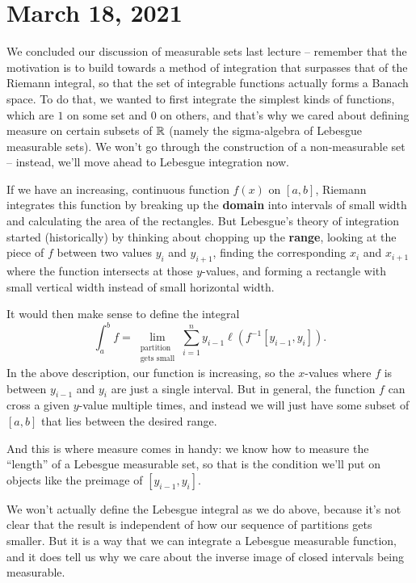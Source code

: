 \pagebreak\section{March 18, 2021}

We concluded our discussion of measurable sets last lecture -- remember that the motivation is to build towards a method of integration that surpasses that of the Riemann integral, so that the set of integrable functions actually forms a Banach space. To do that, we wanted to first integrate the simplest kinds of functions, which are $1$ on some set and $0$ on others, and that's why we cared about defining measure on certain subsets of $\mathbb R$ (namely the sigma-algebra of Lebesgue measurable sets). We won't go through the construction of a non-measurable set -- instead, we'll move ahead to Lebesgue integration now. 

\begin{fact}[Informal]
If we have an increasing, continuous function $f(x)$ on $[a, b]$, Riemann integrates this function by breaking up the \textbf{domain} into intervals of small width and calculating the area of the rectangles. But Lebesgue's theory of integration started (historically) by thinking about chopping up the \textbf{range}, looking at the piece of $f$ between two values $y_i$ and $y_{i+1}$, finding the corresponding $x_i$ and $x_{i+1}$ where the function intersects at those $y$-values, and forming a rectangle with small vertical width instead of small horizontal width. 
\end{fact}

It would then make sense to define the integral
\[
    \int_a^b f = \lim_{\substack{\text{partition} \\ \text{gets small}}} \sum_{i=1}^n y_{i-1} \ell(f^{-1}[y_{i-1}, y_i]).
\]
In the above description, our function is increasing, so the $x$-values where $f$ is between $y_{i-1}$ and $y_i$ are just a single interval. But in general, the function $f$ can cross a given $y$-value multiple times, and instead we will just have some subset of $[a, b]$ that lies between the desired range. 

And this is where measure comes in handy: we know how to measure the ``length'' of a Lebesgue measurable set, so that is the condition we'll put on objects like the preimage of $[y_{i-1}, y_i]$. 

We won't actually define the Lebesgue integral as we do above, because it's not clear that the result is independent of how our sequence of partitions gets smaller. But it is a way that we can integrate a Lebesgue measurable function, and it does tell us why we care about the inverse image of closed intervals being measurable. 

